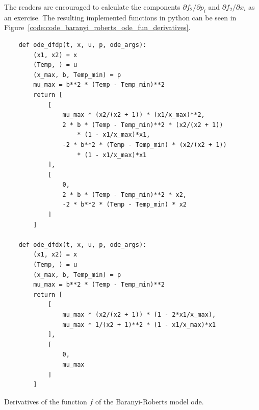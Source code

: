 \documentclass[10pt,A4paper]{article}
\begin{document}
The readers are encouraged to calculate the components $\partial f_2/\partial p_i$ and $\partial f_2/\partial x_i$ as an exercise. 
The resulting implemented functions in python can be seen in Figure~\ref{code:code_baranyi_roberts_ode_fun_derivatives}.
\begin{code}[H]
    \begin{verbatim}
    def ode_dfdp(t, x, u, p, ode_args):
        (x1, x2) = x
        (Temp, ) = u
        (x_max, b, Temp_min) = p
        mu_max = b**2 * (Temp - Temp_min)**2
        return [
            [
                mu_max * (x2/(x2 + 1)) * (x1/x_max)**2,
                2 * b * (Temp - Temp_min)**2 * (x2/(x2 + 1))
                    * (1 - x1/x_max)*x1,
                -2 * b**2 * (Temp - Temp_min) * (x2/(x2 + 1))
                    * (1 - x1/x_max)*x1
            ],
            [
                0,
                2 * b * (Temp - Temp_min)**2 * x2,
                -2 * b**2 * (Temp - Temp_min) * x2
            ]  
        ]

    def ode_dfdx(t, x, u, p, ode_args):
        (x1, x2) = x
        (Temp, ) = u
        (x_max, b, Temp_min) = p
        mu_max = b**2 * (Temp - Temp_min)**2
        return [
            [
                mu_max * (x2/(x2 + 1)) * (1 - 2*x1/x_max),
                mu_max * 1/(x2 + 1)**2 * (1 - x1/x_max)*x1
            ], 
            [
                0,
                mu_max
            ]
        ]
    \end{verbatim}
    \caption{Derivatives of the function $f$ of the Baranyi-Roberts model \ac{ode}.}
    \label{code:code_baranyi_roberts_ode_fun_derivatives}
\end{code}
%
\end{document}

